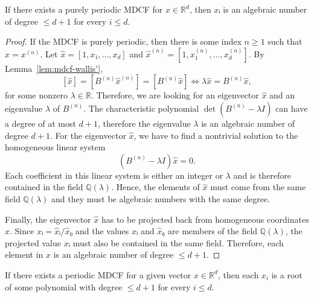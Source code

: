 \begin{lemma}
  \label{lem:mdcf-purely-periodic}
  If there exists a purely periodic MDCF for $x ∈ ℝ^d$,
  then $xᵢ$ is an algebraic number of degree $≤ d+1$ for every $i ≤ d$.
\end{lemma}

\begin{proof}
  If the MDCF is purely periodic, then there is some index $n ≥ 1$ such that $x = x^{(n)}$.
  Let $\hat x = [1, x₁, …, x_d]$ and $\hat x^{(n)} = [1, x_1^{(n)}, …, x_d^{(n)}]$.
  By Lemma~\ref{lem:mdcf-wallis'},
  \[
    [\hat x] = [B^{(n)} \hat x^{(n)}] = [B^{(n)} \hat x] \iff λ \hat x = B^{(n)} \hat x,
  \]
  for some nonzero $λ ∈ ℝ$.
  Therefore, we are looking for an eigenvector $\hat x$ and an eigenvalue $λ$ of $B^{(n)}$.
  The characteristic polynomial $\det(B^{(n)} - λ I)$ can have a degree of at most $d+1$,
  therefore the eigenvalue $λ$ is an algebraic number of degree $d+1$.
  For the eigenvector $\hat x$, we have to find a nontrivial solution to the
  homogeneous linear system
  \[
    (B^{(n)} - λ I) \hat x = 0.
  \]
  Each coefficient in this linear system is either an integer or $λ$ and is
  therefore contained in the field $ℚ(λ)$.
  Hence, the elements of $\hat x$ must come from the same
  field $ℚ(λ)$ and they must be algebraic numbers with the same degree.

  Finally, the eigenvector $\hat x$ has to be projected back from homogeneous coordinates $x$.
  Since $xᵢ = \hat xᵢ / \hat x₀$ and the values $\hat xᵢ$ and $\hat x₀$ are members of the field $ℚ(λ)$,
  the projected value $xᵢ$ must also be contained in the same field.
  Therefore, each element in $x$ is an algebraic number of degree $≤ d+1$.
\end{proof}

\begin{theorem}
  \label{thm:mdcf-periodic}
  If there exists a periodic MDCF for a given vector $x ∈ ℝ^d$,
  then each $x_i$ is a root of some polynomial with degree $≤ d+1$ for every $i ≤ d$.
\end{theorem}

